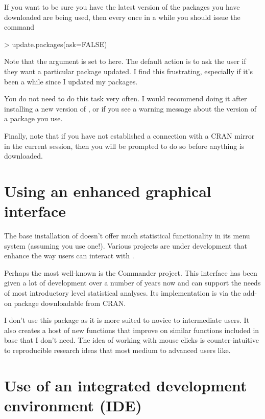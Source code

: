 If you want to be sure you have the latest version of the packages you have downloaded are being used, then every once in a while you should issue the command

\begin{Schunk}
\begin{Sinput}
> update.packages(ask=FALSE)
\end{Sinput}
\end{Schunk}

Note that the  argument is set to  here. The default action is to ask the user if they want a particular package updated. I find this frustrating, especially if it's been a while since I updated my packages.

You do not need to do this task very often. I would recommend doing it after installing a new version of \R{}, or if you see a warning message about the version of a package you use.

Finally, note that if you have not established a connection with a CRAN mirror in the current \R{} session, then you will be prompted to do so before anything is downloaded.

\section{Using an enhanced graphical interface}

The base installation of \R{} doesn't offer much statistical functionality in its menu system (assuming you use one!). Various projects are under development that enhance the way users can interact with \R{}.

Perhaps the most well-known is the \R{} Commander project. This interface has been given a lot of development over a number of years now and can support the needs of most introductory level statistical analyses. Its implementation is via the  add-on package downloadable from CRAN.

I don't use this package as it is more suited to novice to intermediate \R{} users. It also creates a host of new functions that improve on similar functions included in base \R{} that I don't need. The idea of working with mouse clicks is counter-intuitive to reproducible research ideas that most medium to advanced \R{} users like.

\section{Use of an integrated development environment (IDE)} 

